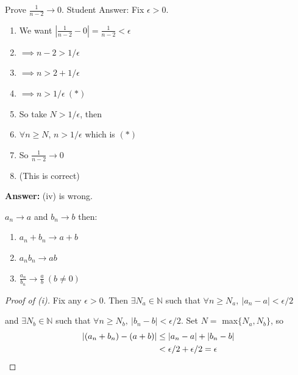 \documentclass[twoside]{scrartcl}
\begin{document}
\begin{clicker}
Prove $\frac{1}{n-2} \to 0$. Student Answer:
Fix $\epsilon >0$.
\begin{enumerate}
	\item We want $|\frac{1}{n-2} - 0| = \frac{1}{n-2} < \epsilon$
	\item $\implies n-2 > 1/\epsilon$
	\item $\implies n > 2 + 1/\epsilon$
	\item $\implies n > 1/\epsilon ~(*)$
	\item So take $N > 1/\epsilon$, then
	\item $\forall n \geq N$, $n > 1/\epsilon$ which is $(*)$
	\item So $\frac{1}{n-2} \to 0$
	\item (This is correct)
\end{enumerate}

\textbf{Answer:} (iv) is wrong. 
	
\end{clicker}


\begin{theorem}\label{thm1}
$a_n \to a$ and $b_n \to b$ then:\begin{enumerate}
\item $a_n+b_n \to a+b$
\item $a_nb_n \to ab$
\item $\frac{a_n}{b_n} \to \frac{a}{b} ~(b \neq 0)$
\end{enumerate}
\end{theorem}
\begin{proof}[Proof of (i)]
Fix any $\epsilon >0$. Then $\exists N_a \in \mathbb{N}$ such that $\forall n\geq N_a,~ |a_n	 - a| < \epsilon/2$ 

and $\exists N_b \in \mathbb{N}$ such that $\forall n \geq N_b,~ |b_n - b| < \epsilon/2$. Set $N =$ max$\{N_a,N_b\}$, so 
\[\begin{aligned}|(a_n + b_n) - (a+b)| &\leq |a_n -a| + |b_n -b| \\
	 &< \epsilon/2 + \epsilon/2 = \epsilon \qedhere
\end{aligned}\]
\end{proof}
\end{document}
